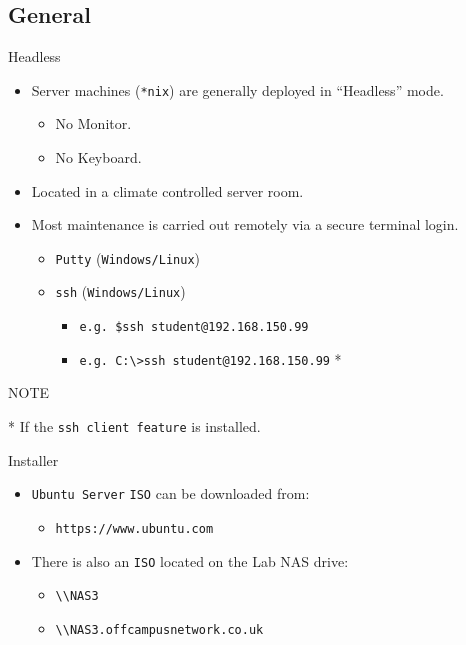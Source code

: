 \documentclass{beamer}
\begin{document}
\subsection{General}
\begin{frame}{Headless}
  \begin{itemize}
    \item Server machines (\texttt{*nix}) are generally deployed in ``Headless'' mode.
    \begin{itemize}
      \item No Monitor.
      \item No Keyboard.
      \end{itemize}
    \item Located in a climate controlled server room.
    \item Most maintenance is carried out remotely via a secure terminal login.
      \begin{itemize}
        \item \texttt{Putty} (\texttt{Windows/Linux})
        \item \texttt{ssh} (\texttt{Windows/Linux})
          \begin{itemize}
            \item \texttt{e.g. \$ssh student@192.168.150.99}
            \item \texttt{e.g. C:\textbackslash\textgreater ssh student@192.168.150.99} *
          \end{itemize}
        \end{itemize}
  \end{itemize}
  \begin{block}{NOTE}
    \begin{center}
      * If the \texttt{ssh client feature} is installed.    
    \end{center}
  \end{block}
\end{frame}

\begin{frame}{Installer}
  \begin{itemize}
    \item \texttt{Ubuntu Server} \texttt{ISO} can be downloaded from:
      \begin{itemize}
        \item \texttt{https://www.ubuntu.com}
      \end{itemize}
    \item There is also an \texttt{ISO} located on the Lab NAS drive:
      \begin{itemize}
        \item \texttt{\textbackslash\textbackslash NAS3}
        \item \texttt{\textbackslash\textbackslash NAS3.offcampusnetwork.co.uk}
      \end{itemize}
  \end{itemize}
\end{frame}
\end{document}
